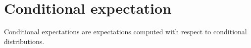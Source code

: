 
\section{Conditional expectation}\label{sec:cond_expe}

Conditional expectations are expectations computed with respect to conditional distributions.

%


